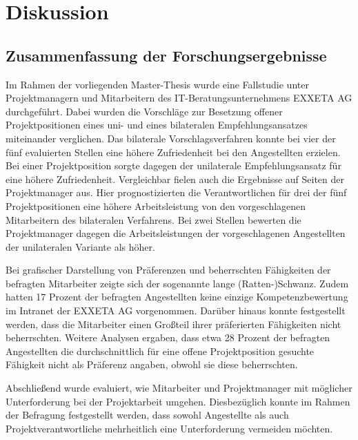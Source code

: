 \chapter{Diskussion}
\label{ch:diskussion}

\section{Zusammenfassung der Forschungsergebnisse}
\label{ch:diskussion:zusammenfassung}
Im Rahmen der vorliegenden Master-Thesis wurde eine Fallstudie unter Projektmanagern und Mitarbeitern des IT-Beratungsunternehmens EXXETA AG durchgeführt. Dabei wurden die Vorschläge zur Besetzung offener Projektpositionen eines uni- und eines bilateralen Empfehlungsansatzes miteinander verglichen. Das bilaterale Vorschlagsverfahren konnte bei vier der fünf evaluierten Stellen eine höhere Zufriedenheit bei den Angestellten erzielen. Bei einer Projektposition sorgte dagegen der unilaterale Empfehlungsansatz für eine höhere Zufriedenheit. Vergleichbar fielen auch die Ergebnisse auf Seiten der Projektmanager aus. Hier prognostizierten die Verantwortlichen für drei der fünf Projektpositionen eine höhere Arbeitsleistung von den vorgeschlagenen Mitarbeitern des bilateralen Verfahrens. Bei zwei Stellen bewerten die Projektmanager dagegen die Arbeitsleistungen der vorgeschlagenen Angestellten der unilateralen Variante als höher.

Bei grafischer Darstellung von Präferenzen und beherrschten Fähigkeiten der befragten Mitarbeiter zeigte sich der sogenannte lange (Ratten-)Schwanz. Zudem hatten 17 Prozent der befragten Angestellten keine einzige Kompetenzbewertung im Intranet der EXXETA AG vorgenommen. Darüber hinaus konnte festgestellt werden, dass die Mitarbeiter einen Großteil ihrer präferierten Fähigkeiten nicht beherrschten. Weitere Analysen ergaben, dass etwa 28 Prozent der befragten Angestellten die durchschnittlich für eine offene Projektposition gesuchte Fähigkeit nicht als Präferenz angaben, obwohl sie diese beherrschten. 

Abschließend wurde evaluiert, wie Mitarbeiter und Projektmanager mit möglicher Unterforderung bei der Projektarbeit umgehen. Diesbezüglich konnte im Rahmen der Befragung festgestellt werden, dass sowohl Angestellte als auch Projektverantwortliche mehrheitlich eine Unterforderung vermeiden möchten.
\newpage
